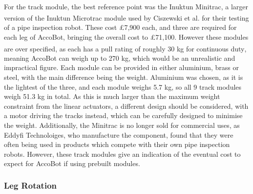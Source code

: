\documentclass[11pt]{article}		%
\newcommand{\supercite}[1]{\textsuperscript{\cite{#1}}}		%
\begin{document}
				\\
                \hspace*{3ex}For the track module, the best reference point was the Inuktun Minitrac, a larger version of the Inuktun Microtrac module used by Ciszewski et al.\supercite{ciszewski2015design} for their testing of a pipe inspection robot.
				These cost £7,900 each, and three are required for each leg of AccoBot, bringing the overall cost to £71,100.
				However these modules are over specified, as each has a pull rating of roughly 30 kg for continuous duty\supercite{inuktunTracks}, meaning AccoBot can weigh up to 270 kg, which would be an unrealistic and impractical figure.
				Each module can be provided in either aluminium, brass or steel, with the main difference being the weight.
				Aluminium was chosen, as it is the lightest of the three, and each module weighs 5.7 kg, so all 9 track modules weigh 51.3 kg in total.
				As this is much larger than the maximum weight constraint from the linear actuators, a different design should be considered, with a motor driving the tracks instead, which can be carefully designed to minimise the weight.
				Additionally, the Minitrac is no longer sold for commercial uses, as Eddyfi Technoloiges, who manufacture the component, found that they were often being used in products which compete with their own pipe inspection robots.
				However, these track modules give an indication of the eventual cost to expect for AccoBot if using prebuilt modules.
				
			\subsubsection{Leg Rotation}
				
\end{document}
